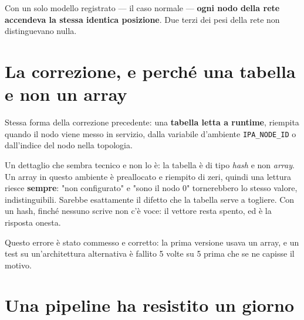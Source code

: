 \documentclass[11pt,a4paper,oneside]{report}
\begin{document}
\begin{lezione}
Con un solo modello registrato --- il caso normale --- \textbf{ogni nodo della
rete accendeva la stessa identica posizione}. Due terzi dei pesi della rete non
distinguevano nulla.
\end{lezione}

\begin{center}
\end{center}

\section{La correzione, e perché una tabella e non un array}

Stessa forma della correzione precedente: una \textbf{tabella letta a runtime},
riempita quando il nodo viene messo in servizio, dalla variabile d'ambiente
\texttt{IPA\_NODE\_ID} o dall'indice del nodo nella topologia.

Un dettaglio che sembra tecnico e non lo è: la tabella è di tipo \emph{hash} e
non \emph{array}. Un array in questo ambiente è preallocato e riempito di zeri,
quindi una lettura riesce \textbf{sempre}: "non configurato" e "sono il nodo 0"
tornerebbero lo stesso valore, indistinguibili. Sarebbe esattamente il difetto
che la tabella serve a togliere. Con un hash, finché nessuno scrive non c'è
voce: il vettore resta spento, ed è la risposta onesta.

Questo errore è stato commesso e corretto: la prima versione usava un array, e
un test su un'architettura alternativa è fallito 5 volte su 5 prima che se ne
capisse il motivo.

\section{Una pipeline ha resistito un giorno}
\end{document}
